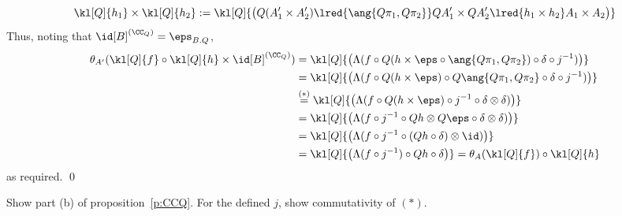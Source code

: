 \documentclass[12pt]{article}
\begin{document}
\[ \kl[Q]{{h_1}}\times\kl[Q]{{h_2}}:=\kl[Q]{\big(Q(A'_1\times A'_2)\lred{\ang{Q\pi_1,Q\pi_2}}QA'_1\times QA'_2\lred{h_1\times h_2}A_1\times A_2\big)} \]
Thus, noting that $\id[B]^{(\CC_Q)}=\eps_{B.Q}$,
\begin{align*}
 \theta_{A'}(\kl[Q]{f}\circ\kl[Q]{h}\times\id[B]^{(\CC_Q)})
    &= \kl[Q]{\big(\Lambda(f\circ Q(h\times\eps\circ\ang{Q\pi_1,Q\pi_2})\circ\delta\circ j^{-1})\big)} \\
    &= \kl[Q]{\big(\Lambda(f\circ Q(h\times\eps)\circ Q\ang{Q\pi_1,Q\pi_2}\circ\delta\circ j^{-1})\big)} \\
    &\overset{(*)}{=} \kl[Q]{\big(\Lambda(f\circ Q(h\times\eps)\circ j^{-1}\circ\delta\otimes\delta)\big)} \\
    &= \kl[Q]{\big(\Lambda(f\circ j^{-1}\circ Qh\otimes Q\eps\circ\delta\otimes\delta)\big)} \\
    &= \kl[Q]{\big(\Lambda(f\circ j^{-1}\circ (Qh\circ\delta)\otimes\id)\big)} \\
    &= \kl[Q]{\big(\Lambda(f\circ j^{-1})\circ Qh\circ\delta\big)}=\theta_A(\kl[Q]{f})\circ\kl[Q]{h}
\end{align*}
as required. \qed
%

\begin{myexercise}
Show part (b) of proposition~\ref{p:CCQ}. For the defined $j$, show commutativity of $(*)$.
\end{myexercise}
\end{document}
